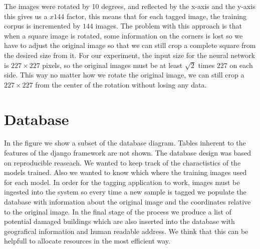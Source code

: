 The images were rotated by 10 degrees, and reflected by the x-axis and the y-axis this gives us a $x144$ factor, this means that for each tagged image, the training corpus is incremented by $144$ images. The problem with this approach is that when a square image is rotated, some information on the corners is lost so we have to adjust the original image so that we can still crop a complete square from the desired size from it. For our experiment, the input size for the neural network is $227\times 227$ pixels, so the original images must be at least $\sqrt{2}$ times $227$ on each side. This way no matter how we rotate the original image, we can still crop a $227\times 227$ from the center of the rotation without losing any data.\\

\section{Database}

In the figure we show a subset of the database diagram. Tables inherent to the features of the django framework are not shown. The database design was based on reproducible reaseach. We wanted to keep track of the charactistics of the models trained. Also we wanted to know which where the training images used for each model. In order for the tagging application to work, images must be ingested into the system so every time a new sample is tagged we populate the database with information about the original image and the coordinates relative to the original image. In the final stage of the process we produce a list of potential damaged buildings which are also inserted into the database with geografical information and human readable address. We think that this can be helpfull to allocate resources in the most efficient way.

\begin{figure}[h]
  \begin{center}
  \end{center}
\end{figure}

